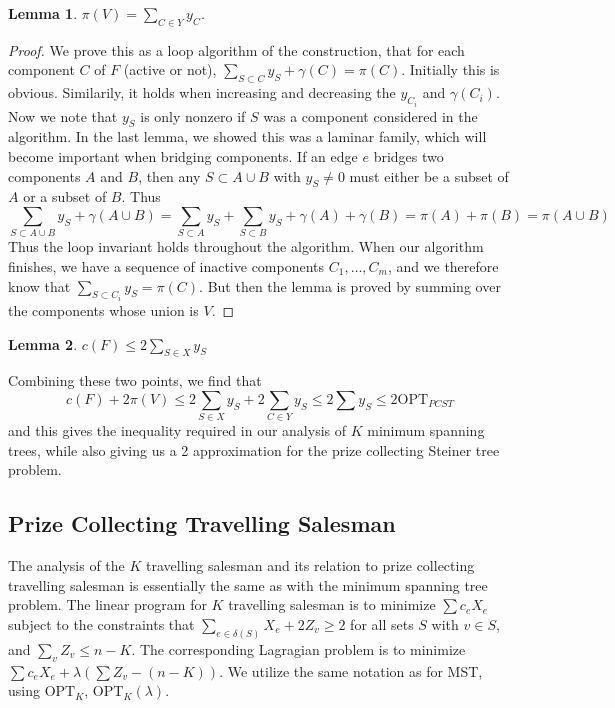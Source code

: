 \documentclass{article}
\theoremstyle{plain}
\newtheorem{lemma}{Lemma}
\begin{document}
\begin{lemma}
    $\pi(V) = \sum_{C \in Y} y_C$.
\end{lemma}
\begin{proof}
    We prove this as a loop algorithm of the construction, that for each component $C$ of $F$ (active or not), $\sum_{S \subset C} y_S + \gamma(C) = \pi(C)$. Initially this is obvious. Similarily, it holds when increasing and decreasing the $y_{C_i}$ and $\gamma(C_i)$. Now we note that $y_S$ is only nonzero if $S$ was a component considered in the algorithm. In the last lemma, we showed this was a laminar family, which will become important when bridging components. If an edge $e$ bridges two components $A$ and $B$, then any $S \subset A \cup B$ with $y_S \neq 0$ must either be a subset of $A$ or a subset of $B$. Thus
    \[ \sum_{S \subset A \cup B} y_S + \gamma(A \cup B) = \sum_{S \subset A} y_S + \sum_{S \subset B} y_S + \gamma(A) + \gamma(B) = \pi(A) + \pi(B) = \pi(A \cup B) \]
    Thus the loop invariant holds throughout the algorithm. When our algorithm finishes, we have a sequence of inactive components $C_1, \dots, C_m$, and we therefore know that $\sum_{S \subset C_i} y_S = \pi(C)$. But then the lemma is proved by summing over the components whose union is $V$.
\end{proof}

\begin{lemma}
    $c(F) \leq 2 \sum_{S \in X} y_S$
\end{lemma}

Combining these two points, we find that
%
\[ c(F) + 2 \pi(V) \leq 2 \sum_{S \in X} y_S + 2 \sum_{C \in Y} y_S \leq 2 \sum y_S \leq 2 \text{OPT}_{PCST} \]
%
and this gives the inequality required in our analysis of $K$ minimum spanning trees, while also giving us a 2 approximation for the prize collecting Steiner tree problem.

\subsection{Prize Collecting Travelling Salesman}

The analysis of the $K$ travelling salesman and its relation to prize collecting travelling salesman is essentially the same as with the minimum spanning tree problem. The linear program for $K$ travelling salesman is to minimize $\sum c_eX_e$ subject to the constraints that $\sum_{e \in \delta(S)} X_e + 2 Z_v \geq 2$ for all sets $S$ with $v \in S$, and $\sum_v Z_v \leq n - K$. The corresponding Lagragian problem is to minimize $\sum c_eX_e + \lambda (\sum Z_v - (n-K))$. We utilize the same notation as for MST, using $\text{OPT}_K$, $\text{OPT}_K(\lambda)$.
\end{document}
